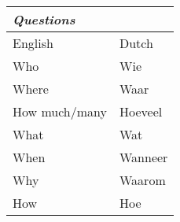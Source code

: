 \documentclass[letterpaper,11pt]{article}
\begin{document}
\begin{tabular}[t]{|l | l|}
    \hline
    \textit{Questions} &         \\
    \hline
    English            & Dutch   \\
    \hline
    Who                & Wie     \\
    Where              & Waar    \\
    How much/many      & Hoeveel \\
    What               & Wat     \\
    When               & Wanneer \\
    Why                & Waarom  \\
    How                & Hoe     \\
    \hline
\end{tabular}
\end{document}
